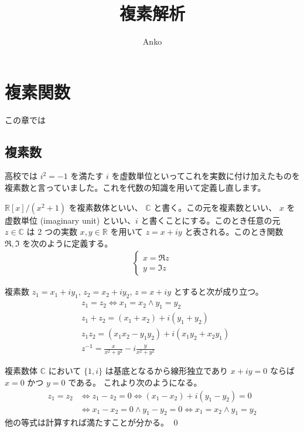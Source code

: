 \documentclass[uplatex,dvipdfmx,a4paper,11pt]{jlreq}
\title{複素解析}
\author{Anko}
\makeatletter
\newcommand{\CC}{\mathbb{C}}
\newcommand{\RR}{\mathbb{R}}
\theoremstyle{definition}
\renewenvironment{proof}[1][\proofname]{\par
  \normalfont
  \topsep6\p@\@plus6\p@ \trivlist
  \item[\hskip\labelsep{\bfseries #1}\@addpunct{\bfseries}]\ignorespaces\quad\par
}{%
  \qed\endtrivlist\@endpefalse
}
\renewcommand\proofname{証明}
\makeatother
\begin{document}
\maketitle

\section{複素関数}
この章では
\subsection{複素数}
高校では $i^2 = -1$ を満たす $i$ を虚数単位といってこれを実数に付け加えたものを複素数と言っていました。これを代数の知識を用いて定義し直します。

\begin{definition}
  $\RR[x]/(x^2 + 1)$ を複素数体といい、 $\CC$ と書く。この元を複素数といい、 $x$ を虚数単位 (imaginary unit) といい、$i$ と書くことにする。このとき任意の元 $z\in\CC$ は 2 つの実数 $x, y\in\RR$ を用いて $z = x + iy$ と表される。このとき関数 $\Re, \Im$ を次のように定義する。
  \begin{align}
    \begin{cases}
      x = \Re z \\
      y = \Im z
    \end{cases}
  \end{align}
\end{definition}

\begin{proposition}
  複素数 $z_1 = x_1 + iy_1$, $z_2 = x_2 + iy_2$, $z = x + iy$ とすると次が成り立つ。
  \begin{align}
     & z_1 = z_2 \iff x_1 = x_2 \land y_1 = y_2            \\
     & z_1 + z_2 = (x_1 + x_2) + i(y_1 + y_2)              \\
     & z_1z_2 = (x_1x_2 - y_1y_2) + i(x_1y_2 + x_2y_1)     \\
     & z^{-1} = \frac{x}{x^2 + y^2} - i\frac{y}{x^2 + y^2}
  \end{align}
\end{proposition}
\begin{proof}
  複素数体 $\CC$ において $\lbrace 1, i\rbrace$ は基底となるから線形独立であり $x + iy = 0$ ならば $x = 0$ かつ $y = 0$ である。
  これより次のようになる。
  \begin{align}
    z_1 = z_2 & \iff z_1 - z_2 = 0 \iff (x_1 - x_2) + i(y_1 - y_2) = 0                \\
              & \iff x_1 - x_2 = 0 \land y_1 - y_2 = 0 \iff x_1 = x_2 \land y_1 = y_2
  \end{align}
  他の等式は計算すれば満たすことが分かる。
\end{proof}
\end{document}
